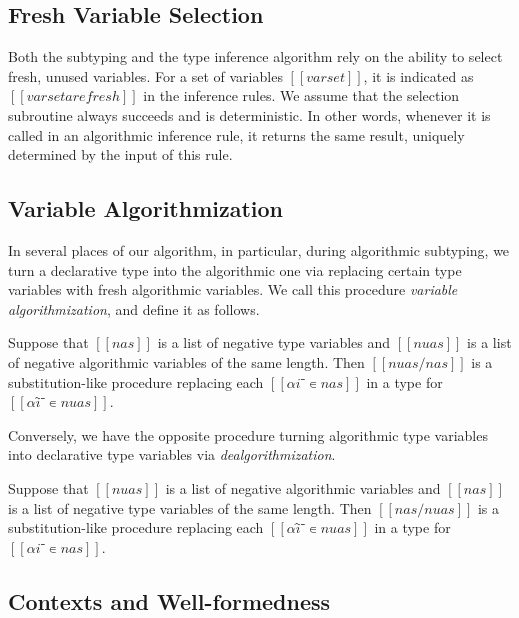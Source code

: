 \documentclass[a4,natbib=false]{article}
\begin{document}
\subsection{Fresh Variable Selection}
\label{sec:fresh-selection}
Both the subtyping and the type inference algorithm
rely on the ability to select fresh, unused variables.
For a set of variables $[[varset]]$, it is indicated as 
$[[varset are fresh]]$ in the inference rules.
We assume that the selection subroutine always succeeds and is 
deterministic. In other words, whenever it is called in 
an algorithmic inference rule, it returns the same result, 
uniquely determined by the input of this rule.

\subsection{Variable Algorithmization}
\label{sec:variable-algorithmization}

In several places of our algorithm, in particular, during
algorithmic subtyping,
we turn a declarative type into the algorithmic one
via replacing certain type variables with fresh algorithmic variables.
We call this procedure \emph{variable algorithmization}, and define it as follows.

\begin{definition}
  Suppose that $[[nas]]$ is a list of negative type variables
  and $[[nuas]]$ is a list of negative algorithmic variables of the same length. 
  Then $[[ nuas/nas ]]$ is a substitution-like procedure replacing each $[[αi⁻ ∊ {nas}]]$
  in a type for $[[αî⁻ ∊ {nuas}]]$.
\end{definition}

Conversely, we have the opposite procedure turning algorithmic type variables
into declarative type variables via \emph{dealgorithmization}.

\begin{definition}
  Suppose that $[[nuas]]$ is a list of negative algorithmic variables
  and $[[nas]]$ is a list of negative type variables of the same length. 
  Then $[[ nas/nuas ]]$ is a substitution-like procedure replacing each
  $[[αî⁻ ∊ {nuas}]]$ in a type for $[[αi⁻ ∊ {nas}]]$.
\end{definition}


\subsection{Contexts and Well-formedness}
\end{document}
